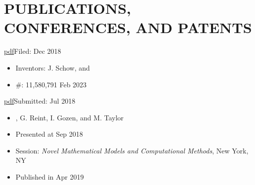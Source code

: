 \section*{PUBLICATIONS, CONFERENCES, AND PATENTS}


\subtitle{Automobile Damage Detection Using Thermal Conductivity}{\href{https://ppubs.uspto.gov/api/pdf/downloadPdf/11580791?requestToken=eyJzdWIiOiIwMmQ4MTkyZC1kYzc4LTRhYWMtYjhlNC04OGJjMjU1OTI4MGEiLCJ2ZXIiOiIyNWFlNjI5Yi0xZTVhLTRhYjItYTFjMC00OTI2NTE4MDc0NzQiLCJleHAiOjB9}{pdf}}{Filed: Dec 2018}

\begin{itemize}
    \item Inventors: J. Schow, and  
    \item {} \#: 11,580,791
    \hfill Feb 2023
\end{itemize}


\subtitle{A Cellular Automaton for Modeling Non-Trivial Biomembrane Ruptures}{\href{https://www.biorxiv.org/content/10.1101/429548v1.full.pdf}{pdf}}{Submitted: Jul 2018}

\begin{itemize}
    \item {}, G. Reint, I. Gozen, and M. Taylor
    \item Presented at 
    \hfill Sep 2018
    \item Session: {\itshape Novel Mathematical Models and Computational Methods}, New York, NY
    \item Published in  
    \hfill Apr 2019
\end{itemize}



